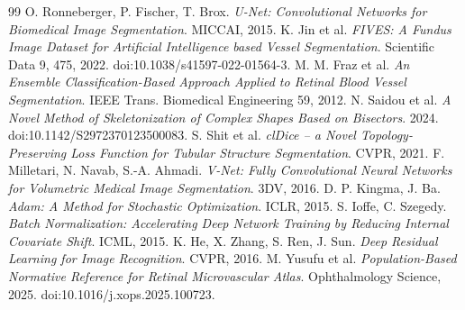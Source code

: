 \documentclass[11pt,a4paper]{article}
\begin{document}
\begin{thebibliography}{99}\small
{} O. Ronneberger, P. Fischer, T. Brox. \emph{U-Net: Convolutional Networks for Biomedical Image Segmentation}. MICCAI, 2015.
 K. Jin et al. \emph{FIVES: A Fundus Image Dataset for Artificial Intelligence based Vessel Segmentation}. Scientific Data 9, 475, 2022. doi:10.1038/s41597-022-01564-3.
 M. M. Fraz et al. \emph{An Ensemble Classification-Based Approach Applied to Retinal Blood Vessel Segmentation}. IEEE Trans. Biomedical Engineering 59, 2012.
 N. Saidou et al. \emph{A Novel Method of Skeletonization of Complex Shapes Based on Bisectors}. 2024. doi:10.1142/S2972370123500083.
 S. Shit et al. \emph{clDice -- a Novel Topology-Preserving Loss Function for Tubular Structure Segmentation}. CVPR, 2021.
 F. Milletari, N. Navab, S.-A. Ahmadi. \emph{V-Net: Fully Convolutional Neural Networks for Volumetric Medical Image Segmentation}. 3DV, 2016.
 D. P. Kingma, J. Ba. \emph{Adam: A Method for Stochastic Optimization}. ICLR, 2015.
 S. Ioffe, C. Szegedy. \emph{Batch Normalization: Accelerating Deep Network Training by Reducing Internal Covariate Shift}. ICML, 2015.
 K. He, X. Zhang, S. Ren, J. Sun. \emph{Deep Residual Learning for Image Recognition}. CVPR, 2016.
 M. Yusufu et al. \emph{Population-Based Normative Reference for Retinal Microvascular Atlas}. Ophthalmology Science, 2025. doi:10.1016/j.xops.2025.100723.
\end{thebibliography}
\end{document}
